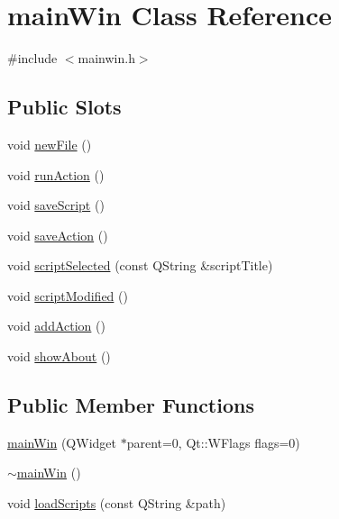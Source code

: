 \hypertarget{classmain_win}{\section{main\-Win Class Reference}
\label{classmain_win}
}


{\ttfamily \#include $<$mainwin.\-h$>$}

\subsection*{Public Slots}
\begin{DoxyCompactItemize}
\item 
void \hyperlink{classmain_win_a5a5ebff7e72fcf1a9d840d8030b535b3}{new\-File} ()
\item 
void \hyperlink{classmain_win_acf0324a155856e59cdea5ec5698f5514}{run\-Action} ()
\item 
void \hyperlink{classmain_win_a647971cd2796a848d88990680ca8c47f}{save\-Script} ()
\item 
void \hyperlink{classmain_win_ab7665b16866b9aeecbe430ef17769ac4}{save\-Action} ()
\item 
void \hyperlink{classmain_win_af5eb5f12f6e8bf37e9a293e28d82632c}{script\-Selected} (const Q\-String \&script\-Title)
\item 
void \hyperlink{classmain_win_affa3129c6021871bfc6ab5acccb0a9c5}{script\-Modified} ()
\item 
void \hyperlink{classmain_win_abfe17be5efdd261fa5d73c37c66b57e8}{add\-Action} ()
\item 
void \hyperlink{classmain_win_a971bee9dff02167121566f9a4444af4e}{show\-About} ()
\end{DoxyCompactItemize}
\subsection*{Public Member Functions}
\begin{DoxyCompactItemize}
\item 
\hyperlink{classmain_win_a837aa6380bc037afd022629b56b7aca9}{main\-Win} (Q\-Widget $\ast$parent=0, Qt\-::\-W\-Flags flags=0)
\item 
\hyperlink{classmain_win_a70326ccd243eb2060b1b5a3150025a9d}{$\sim$main\-Win} ()
\item 
void \hyperlink{classmain_win_a3a1257aa1b06a426b08763a72756f06a}{load\-Scripts} (const Q\-String \&path)
\end{DoxyCompactItemize}
